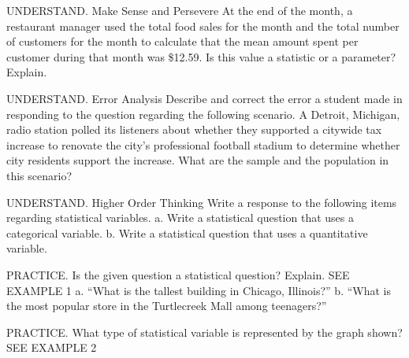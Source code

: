 \documentclass{article}
\newenvironment{practice}[2]{}{}        %
\newcommand{\answer}[1]{}               %
\newcommand{\placeholder}[2]{}          %
\newcommand{\te}[1]{}                   %
\begin{document}
\begin{practice}{9}{1}
UNDERSTAND. Make Sense and Persevere At the end of the month, a restaurant manager used the total food sales for the month and the total number of customers for the month to calculate that the mean amount spent per customer during that month was \$12.59. Is this value a statistic or a parameter? Explain.
\answer{This is a parameter because it involves the entire population of the restaurant's customers during that month and because the restaurant wanted to know only about that one month.}
\end{practice}
\begin{practice}{10}{3}
UNDERSTAND. Error Analysis Describe and correct the error a student made in responding to the question regarding the following scenario.
A Detroit, Michigan, radio station polled its listeners about whether they supported a citywide tax increase to renovate the city's professional football stadium to determine whether city residents support the increase. What are the sample and the population in this scenario?
\te{Student work marked with a red X: The sample is the listeners of the radio station. The population is all the registered voters in the state of Michigan.}
\answer{The population should be all the residents of the city of Detroit, since it is a city tax, rather than a state tax.}
\end{practice}
\begin{practice}{11}{2}
UNDERSTAND. Higher Order Thinking Write a response to the following items regarding statistical variables.
a. Write a statistical question that uses a categorical variable.
b. Write a statistical question that uses a quantitative variable.
\answer{a. Sample: What is your favorite primary color? b. Sample: What is your hourly wage?}
\end{practice}
\begin{practice}{12}{1}
PRACTICE. Is the given question a statistical question? Explain. SEE EXAMPLE 1
 a. ``What is the tallest building in Chicago, Illinois?''
 b. ``What is the most popular store in the Turtlecreek Mall among teenagers?''
\answer{a. No; it is a question to which there is only one answer. b. Yes; this is a question to which multiple responses are anticipated.}
\end{practice}
\begin{practice}{13}{1}
PRACTICE. What type of statistical variable is represented by the graph shown? SEE EXAMPLE 2
\placeholder{graph}{Most Popular H.S. Sport to Watch pie chart. Clockwise from the top: blue Football 45\%, orange Basketball 21\%, green Baseball 10\%, purple Volleyball 10\%, gold Soccer 14\%. Percentages inside sectors; sport labels outside with leader lines. No axes.}
\answer{The statistical variable is categorical, because the values belong to a limited set of possible qualitative responses.}
\end{practice}
\end{document}
